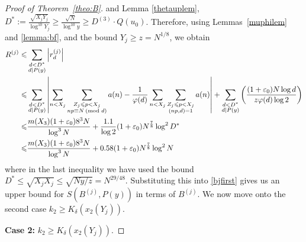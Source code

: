 \documentclass[12pt]{amsart}
\begin{document}
\begin{proof}[Proof of Theorem~\ref{theo:B}]
and Lemma \ref{thetauplem}, \label{def-part-D^*} $D^*:=\frac{\sqrt{X_jY_j}}{\log^{10}Y_j}\ge \frac{\sqrt{N}}{\log^{10} y}\ge D^{(3)}\cdot Q(u_0) $. Therefore, using Lemmas~\ref{muphilem} and \ref{lemma:bf}, and the bound $Y_j\ge z = N^{1/8}$, we obtain
\begin{align}
R^{(j)} \le & \sum_{\substack{d<D^*\\ d|P(y)}}\left|r_d^{(j)}\right|\notag\\
\le & \sum_{\substack{d<D^*\\ d|P(y)}}\left|\sum_{n<X_j}\sum_{\substack{Z_j \le p <X_j\\np\equiv N\: (\text{mod }d)}} a(n)-\frac{1}{\varphi (d)}\sum_{n<X_j}\sum_{\substack{Z_j\le p<X_j\\ (np,d)=1}}a(n)\right|+\sum_{\substack{d<D^*\\d\mid P(y)}}\left(\frac{(1+\varepsilon_0)N\log d}{z\varphi(d)\log 2} \right)\notag\\
\le&\frac{m(X_3)(1+\varepsilon_0)8^3N}{\log^3 N}+\frac{1.1}{\log 2}(1+\varepsilon_0)N^{\frac{7}{8}}\log^2 D^*\notag\\
\le & \frac{m(X_3)(1+\varepsilon_0)8^3N}{\log^3 N}+0.58(1+\varepsilon_0)N^{\frac{7}{8}}\log^2 N\label{rjfirst}
\end{align}
where in the last inequality we have used the bound $D^*\le\sqrt{X_jX_j}\le\sqrt{Ny/z}=N^{29/48}$. Substituting this into \eqref{bjfirst} gives us an upper bound for $S(B^{(j)},P(y))$ in terms of $B^{(j)}$. We now move onto the second case $k_2\ge K_{\delta}(x_2(Y_j))$.\newline

\noindent\textbf{Case 2:} $k_2\ge K_{\delta}(x_2(Y_j))$.


\end{proof}
\end{document}
